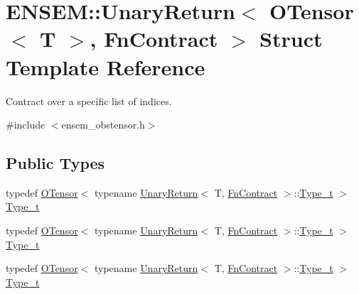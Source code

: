 \hypertarget{structENSEM_1_1UnaryReturn_3_01OTensor_3_01T_01_4_00_01FnContract_01_4}{}\section{E\+N\+S\+EM\+:\+:Unary\+Return$<$ O\+Tensor$<$ T $>$, Fn\+Contract $>$ Struct Template Reference}
\label{structENSEM_1_1UnaryReturn_3_01OTensor_3_01T_01_4_00_01FnContract_01_4}


Contract over a specific list of indices.  




{\ttfamily \#include $<$ensem\+\_\+obstensor.\+h$>$}

\subsection*{Public Types}
\begin{DoxyCompactItemize}
\item 
typedef \mbox{\hyperlink{classENSEM_1_1OTensor}{O\+Tensor}}$<$ typename \mbox{\hyperlink{structENSEM_1_1UnaryReturn}{Unary\+Return}}$<$ T, \mbox{\hyperlink{structENSEM_1_1FnContract}{Fn\+Contract}} $>$\+::\mbox{\hyperlink{structENSEM_1_1UnaryReturn_3_01OTensor_3_01T_01_4_00_01FnContract_01_4_a5b94783dc2f622ca8629f6318a2332ac}{Type\+\_\+t}} $>$ \mbox{\hyperlink{structENSEM_1_1UnaryReturn_3_01OTensor_3_01T_01_4_00_01FnContract_01_4_a5b94783dc2f622ca8629f6318a2332ac}{Type\+\_\+t}}
\item 
typedef \mbox{\hyperlink{classENSEM_1_1OTensor}{O\+Tensor}}$<$ typename \mbox{\hyperlink{structENSEM_1_1UnaryReturn}{Unary\+Return}}$<$ T, \mbox{\hyperlink{structENSEM_1_1FnContract}{Fn\+Contract}} $>$\+::\mbox{\hyperlink{structENSEM_1_1UnaryReturn_3_01OTensor_3_01T_01_4_00_01FnContract_01_4_a5b94783dc2f622ca8629f6318a2332ac}{Type\+\_\+t}} $>$ \mbox{\hyperlink{structENSEM_1_1UnaryReturn_3_01OTensor_3_01T_01_4_00_01FnContract_01_4_a5b94783dc2f622ca8629f6318a2332ac}{Type\+\_\+t}}
\item 
typedef \mbox{\hyperlink{classENSEM_1_1OTensor}{O\+Tensor}}$<$ typename \mbox{\hyperlink{structENSEM_1_1UnaryReturn}{Unary\+Return}}$<$ T, \mbox{\hyperlink{structENSEM_1_1FnContract}{Fn\+Contract}} $>$\+::\mbox{\hyperlink{structENSEM_1_1UnaryReturn_3_01OTensor_3_01T_01_4_00_01FnContract_01_4_a5b94783dc2f622ca8629f6318a2332ac}{Type\+\_\+t}} $>$ \mbox{\hyperlink{structENSEM_1_1UnaryReturn_3_01OTensor_3_01T_01_4_00_01FnContract_01_4_a5b94783dc2f622ca8629f6318a2332ac}{Type\+\_\+t}}
\end{DoxyCompactItemize}


